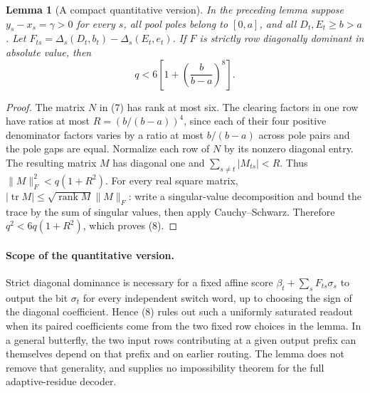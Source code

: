 \documentclass[11pt]{article}
\newtheorem{lemma}{Lemma}
\begin{document}
\begin{lemma}[A compact quantitative version]
In the preceding lemma suppose $y_s-x_s=\gamma>0$ for every $s$,
all pool poles belong to $[0,a]$, and all $D_t,E_t\geq b>a$.
Let $F_{ts}=\Delta_s(D_t,b_t)-\Delta_s(E_t,e_t)$.
If $F$ is strictly row diagonally dominant in absolute value, then
\[
 q<6\left[1+\left(\frac{b}{b-a}\right)^8\right].       \tag{8}
\]
\end{lemma}
\begin{proof}
The matrix $N$ in (7) has rank at most six. The clearing factors in
one row have ratios at most
$R=(b/(b-a))^4$, since each of their four positive denominator
factors varies by a ratio at most $b/(b-a)$ across pole pairs and
the pole gaps are equal. Normalize each row of $N$ by its nonzero
diagonal entry. The resulting matrix $M$ has diagonal one and
$\sum_{s\ne t}|M_{ts}|<R$. Thus
$\|M\|_F^2<q(1+R^2)$. For every real square matrix,
$|\operatorname{tr}M|\leq\sqrt{\operatorname{rank}M}\|M\|_F$:
write a singular-value decomposition and bound the trace by the sum
of singular values, then apply Cauchy--Schwarz. Therefore
$q^2<6q(1+R^2)$, which proves (8).
\end{proof}

\paragraph{Scope of the quantitative version.}
Strict diagonal dominance is necessary for a fixed affine score
$\beta_t+\sum_sF_{ts}\sigma_s$ to output the bit $\sigma_t$ for
every independent switch word, up to choosing the sign of the
diagonal coefficient. Hence (8) rules out such a uniformly saturated
readout when its paired coefficients come from the two fixed row
choices in the lemma. In a general butterfly, the two input rows
contributing at a given output prefix can themselves depend on that
prefix and on earlier routing. The lemma does not remove that
generality, and supplies no impossibility theorem for the full
adaptive-residue decoder.
\end{document}
